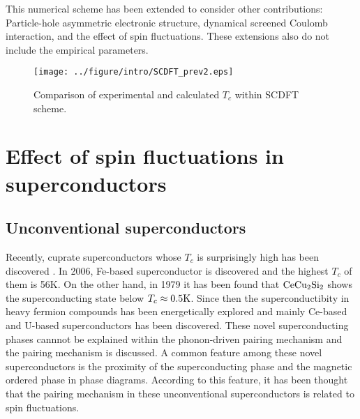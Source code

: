 This numerical scheme has been extended to consider other contributions:
Particle-hole asymmetric electronic structure\cite{RA2013phasy}, dynamical screened Coulomb 
interaction\cite{RA2013}, and the effect of spin fluctuations\cite{Essenberger2014}.
These extensions also do not include the empirical parameters. 

\begin{figure} %
	\centering
	\texttt{[image: ../figure/intro/SCDFT\_prev2.eps]}
	\caption{Comparison of experimental and calculated $T_c$ 
		within SCDFT scheme\cite{Marques2005, Sanna2007, Floris2005}.}
	\label{fig:scdft_compare}
\end{figure}


\section{Effect of spin fluctuations in superconductors} %
\subsection{Unconventional superconductors}
Recently, cuprate superconductors whose $T_c$ is surprisingly high has been discovered
\cite{Bednorz1986}. In 2006, Fe-based superconductor is discovered\cite{Kamihara2006} and the highest
$T_c$ of them is 56K\cite{wang2008}. On the other hand, in 1979 it has been found that $\rm CeCu_2Si_2$ 
shows the superconducting state below $T_c \approx 0.5\rm K$\cite{Steglich1979}. Since then the superconductibity in
heavy fermion compounds has been energetically explored and mainly Ce-based and U-based superconductors
has been discovered\cite{Pfleiderer2009}.
These novel superconducting phases cannnot be explained within the phonon-driven pairing mechanism and
the pairing mechanism is discussed\cite{Scalapino2012}.
A common feature among these novel superconductors is the proximity of the superconducting phase
and the magnetic ordered phase in phase diagrams.
According to this feature, it has been thought that the pairing mechanism in these unconventional
superconductors is related to spin fluctuations\cite{Scalapino2012}.


